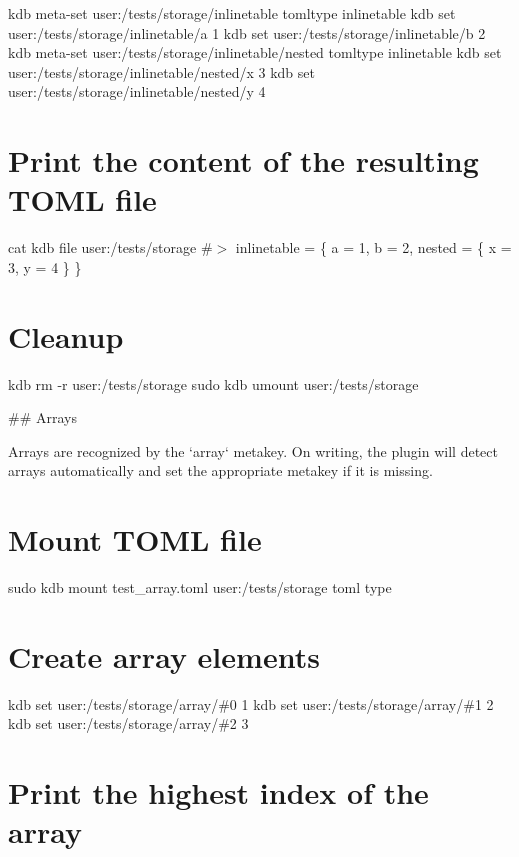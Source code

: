 kdb meta-\/set \textquotesingle{}user\+:/tests/storage/inlinetable\textquotesingle{} \textquotesingle{}tomltype\textquotesingle{} \textquotesingle{}inlinetable\textquotesingle{} kdb set \textquotesingle{}user\+:/tests/storage/inlinetable/a\textquotesingle{} \textquotesingle{}1\textquotesingle{} kdb set \textquotesingle{}user\+:/tests/storage/inlinetable/b\textquotesingle{} \textquotesingle{}2\textquotesingle{} kdb meta-\/set \textquotesingle{}user\+:/tests/storage/inlinetable/nested\textquotesingle{} \textquotesingle{}tomltype\textquotesingle{} \textquotesingle{}inlinetable\textquotesingle{} kdb set \textquotesingle{}user\+:/tests/storage/inlinetable/nested/x\textquotesingle{} \textquotesingle{}3\textquotesingle{} kdb set \textquotesingle{}user\+:/tests/storage/inlinetable/nested/y\textquotesingle{} \textquotesingle{}4\textquotesingle{}\hypertarget{autotoc_md635_autotoc_md713}{}\section{Print the content of the resulting T\+O\+M\+L file}\label{autotoc_md635_autotoc_md713}
cat {\ttfamily kdb file user\+:/tests/storage} \#$>$ inlinetable = \{ a = 1, b = 2, nested = \{ x = 3, y = 4 \} \}\hypertarget{autotoc_md635_autotoc_md714}{}\section{Cleanup}\label{autotoc_md635_autotoc_md714}
kdb rm -\/r user\+:/tests/storage sudo kdb umount user\+:/tests/storage 
\begin{DoxyCode}
## Arrays

Arrays are recognized by the `array` metakey. On writing, the plugin will detect arrays automatically and
       set the appropriate metakey if it is missing.
\end{DoxyCode}
 \hypertarget{autotoc_md635_autotoc_md715}{}\section{Mount T\+O\+M\+L file}\label{autotoc_md635_autotoc_md715}
sudo kdb mount test\+\_\+array.\+toml user\+:/tests/storage toml type\hypertarget{autotoc_md635_autotoc_md716}{}\section{Create array elements}\label{autotoc_md635_autotoc_md716}
kdb set \textquotesingle{}user\+:/tests/storage/array/\#0\textquotesingle{} \textquotesingle{}1\textquotesingle{} kdb set \textquotesingle{}user\+:/tests/storage/array/\#1\textquotesingle{} \textquotesingle{}2\textquotesingle{} kdb set \textquotesingle{}user\+:/tests/storage/array/\#2\textquotesingle{} \textquotesingle{}3\textquotesingle{}\hypertarget{autotoc_md635_autotoc_md717}{}\section{Print the highest index of the array}\label{autotoc_md635_autotoc_md717}
